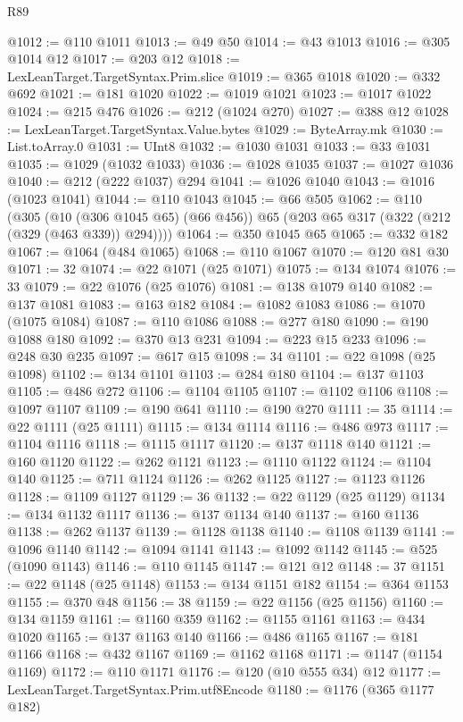 \begin{lexlean}{R89}
\begin{coremodule}
@1012 := @110 @1011
@1013 := @49 @50
@1014 := @43 @1013
@1016 := @305 @1014 @12
@1017 := @203 @12
@1018 := LexLeanTarget.TargetSyntax.Prim.slice
@1019 := @365 @1018
@1020 := @332 @692
@1021 := @181 @1020
@1022 := @1019 @1021
@1023 := @1017 @1022
@1024 := @215 @476
@1026 := @212 (@1024 @270)
@1027 := @388 @12
@1028 := LexLeanTarget.TargetSyntax.Value.bytes
@1029 := ByteArray.mk
@1030 := List.toArray.{0}
@1031 := UInt8
@1032 := @1030 @1031
@1033 := @33 @1031
@1035 := @1029 (@1032 @1033)
@1036 := @1028 @1035
@1037 := @1027 @1036
@1040 := @212 (@222 @1037) @294
@1041 := @1026 @1040
@1043 := @1016 (@1023 @1041)
@1044 := @110 @1043
@1045 := @66 @505
@1062 := @110
    (@305
      (@10 (@306 @1045 @65) (@66 @456))
      @65
      (@203 @65 @317 (@322 (@212 (@329 (@463 @339)) @294))))
@1064 := @350 @1045 @65
@1065 := @332 @182
@1067 := @1064 (@484 @1065)
@1068 := @110 @1067
@1070 := @120 @81 @30
@1071 := 32
@1074 := @22 @1071 (@25 @1071)
@1075 := @134 @1074
@1076 := 33
@1079 := @22 @1076 (@25 @1076)
@1081 := @138 @1079 @140
@1082 := @137 @1081
@1083 := @163 @182
@1084 := @1082 @1083
@1086 := @1070 (@1075 @1084)
@1087 := @110 @1086
@1088 := @277 @180
@1090 := @190 @1088 @180
@1092 := @370 @13 @231
@1094 := @223 @15 @233
@1096 := @248 @30 @235
@1097 := @617 @15
@1098 := 34
@1101 := @22 @1098 (@25 @1098)
@1102 := @134 @1101
@1103 := @284 @180
@1104 := @137 @1103
@1105 := @486 @272
@1106 := @1104 @1105
@1107 := @1102 @1106
@1108 := @1097 @1107
@1109 := @190 @641
@1110 := @190 @270
@1111 := 35
@1114 := @22 @1111 (@25 @1111)
@1115 := @134 @1114
@1116 := @486 @973
@1117 := @1104 @1116
@1118 := @1115 @1117
@1120 := @137 @1118 @140
@1121 := @160 @1120
@1122 := @262 @1121
@1123 := @1110 @1122
@1124 := @1104 @140
@1125 := @711 @1124
@1126 := @262 @1125
@1127 := @1123 @1126
@1128 := @1109 @1127
@1129 := 36
@1132 := @22 @1129 (@25 @1129)
@1134 := @134 @1132 @1117
@1136 := @137 @1134 @140
@1137 := @160 @1136
@1138 := @262 @1137
@1139 := @1128 @1138
@1140 := @1108 @1139
@1141 := @1096 @1140
@1142 := @1094 @1141
@1143 := @1092 @1142
@1145 := @525 (@1090 @1143)
@1146 := @110 @1145
@1147 := @121 @12
@1148 := 37
@1151 := @22 @1148 (@25 @1148)
@1153 := @134 @1151 @182
@1154 := @364 @1153
@1155 := @370 @48
@1156 := 38
@1159 := @22 @1156 (@25 @1156)
@1160 := @134 @1159
@1161 := @1160 @359
@1162 := @1155 @1161
@1163 := @434 @1020
@1165 := @137 @1163 @140
@1166 := @486 @1165
@1167 := @181 @1166
@1168 := @432 @1167
@1169 := @1162 @1168
@1171 := @1147 (@1154 @1169)
@1172 := @110 @1171
@1176 := @120 (@10 @555 @34) @12
@1177 := LexLeanTarget.TargetSyntax.Prim.utf8Encode
@1180 := @1176 (@365 @1177 @182)

\end{coremodule}
\end{lexlean}
